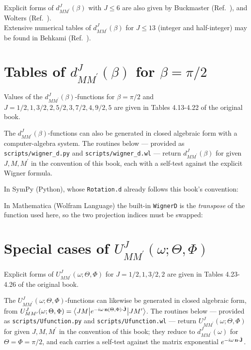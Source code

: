 Explicit forms of $d_{M M^{\prime}}^{J}(\beta)$ with $J \leq 6$ are also given by Buckmaster (Ref.~\cite{ref116}), and Wolters (Ref.~\cite{ref129}).\\
Extensive numerical tables of $d_{M M^{\prime}}^{J}(\beta)$ for $J \leq 13$ (integer and half-integer) may be found in Behkami (Ref.~\cite{ref114}).

\section{Tables of $d_{M M^{\prime}}^{J}(\beta)$ for $\beta=\pi / 2$}\label{sec:4.21}
Values of the $d_{M M^{\prime}}^{J}(\beta)$-functions for $\beta=\pi / 2$ and $J=1 / 2,1,3 / 2,2,5 / 2,3,7 / 2,4,9 / 2,5$ are given in Tables 4.13-4.22 of the original book.

The $d_{M M^{\prime}}^{J}(\beta)$-functions can also be generated in closed algebraic form with a computer-algebra system. The routines below --- provided as \texttt{scripts/wigner\_d.py} and \texttt{scripts/wigner\_d.wl} --- return $d_{M M^{\prime}}^{J}(\beta)$ for given $J,M,M^{\prime}$ in the convention of this book, each with a self-test against the explicit Wigner formula.

In SymPy (Python), whose \lstinline!Rotation.d! already follows this book's convention:


In Mathematica (Wolfram Language) the built-in \lstinline!WignerD! is the \emph{transpose} of the function used here, so the two projection indices must be swapped:


\section{Special cases of $U_{M M^{\prime}}^{J}(\omega ; \Theta, \Phi)$}\label{sec:4.22}
Explicit forms of $U_{M M^{\prime}}^{J}(\omega ; \Theta, \Phi)$ for $J=1 / 2,1,3 / 2,2$ are given in Tables 4.23-4.26 of the original book.

The $U_{M M^{\prime}}^{J}(\omega ; \Theta, \Phi)$-functions can likewise be generated in closed algebraic form, from $U_{M M^{\prime}}^{J}(\omega ; \Theta, \Phi)=\bigl\langle J M \big| e^{-i \omega \, \mathbf{n}(\Theta, \Phi) \cdot \hat{\mathbf{J}}} \big| J M^{\prime} \bigr\rangle$. The routines below --- provided as \texttt{scripts/Ufunction.py} and \texttt{scripts/Ufunction.wl} --- return $U_{M M^{\prime}}^{J}(\omega ; \Theta, \Phi)$ for given $J,M,M^{\prime}$ in the convention of this book; they reduce to $d_{M M^{\prime}}^{J}(\omega)$ for $\Theta=\Phi=\pi / 2$, and each carries a self-test against the matrix exponential $e^{-i \omega \, \mathbf{n} \cdot \hat{\mathbf{J}}}$.

